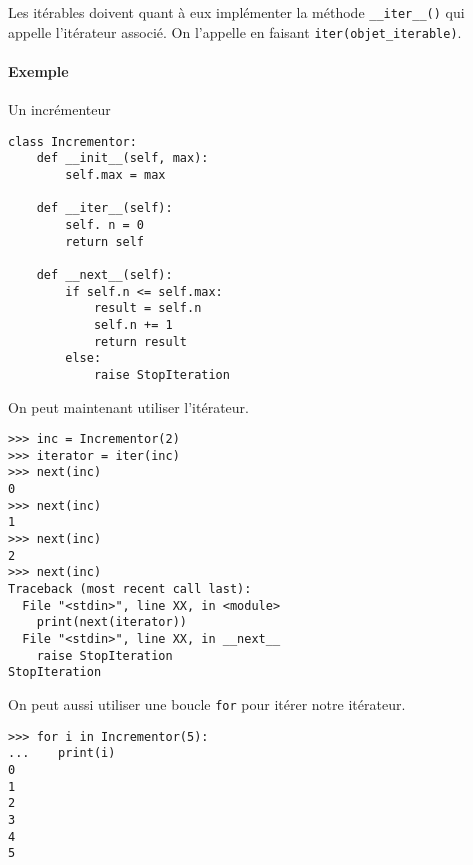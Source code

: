 Les itérables doivent quant à eux implémenter la méthode \texttt{__iter__()} qui appelle l'itérateur associé. On l'appelle en faisant \texttt{iter(objet_iterable)}.

\paragraph{Exemple} Un incrémenteur
\begin{verbatim}
class Incrementor:
    def __init__(self, max):
        self.max = max

    def __iter__(self):
        self. n = 0
        return self

    def __next__(self):
        if self.n <= self.max:
            result = self.n
            self.n += 1
            return result
        else:
            raise StopIteration
\end{verbatim}
On peut maintenant utiliser l'itérateur.
\begin{verbatim}
>>> inc = Incrementor(2)
>>> iterator = iter(inc)
>>> next(inc)
0
>>> next(inc)
1
>>> next(inc)
2
>>> next(inc)
Traceback (most recent call last):
  File "<stdin>", line XX, in <module>
    print(next(iterator))
  File "<stdin>", line XX, in __next__
    raise StopIteration
StopIteration
\end{verbatim}
On peut aussi utiliser une boucle \texttt{for} pour itérer notre itérateur.
\begin{verbatim}
>>> for i in Incrementor(5):
...    print(i)
0
1
2
3
4
5
\end{verbatim}